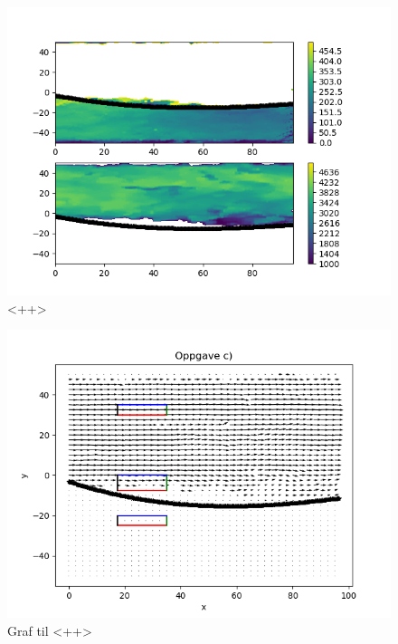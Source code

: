 \documentclass[a4paper,10pt,norsk]{article}
\begin{document}
	\newpage
	\begin{figure}[h!]
		\centering
		\caption{<++>}
		\label{fig:b}
		\includegraphics{oppgave_b.png}
	\end{figure}
	\begin{figure}[h!]
		\centering
		\caption{Graf til <++>}
		\label{fig:c}
		\includegraphics{oppgave_c.png}
	\end{figure}
\end{document}
